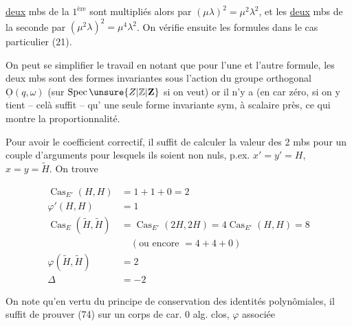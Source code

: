 \uline{deux} mbs de la $1^{\mathrm{ère}}$ sont multipliés alors par $(\mu\lambda)^2=\mu^2\lambda^2$, et les \uline{deux} mbs de la seconde par $(\mu^2\lambda)^2=\mu^4\lambda^2$. On vérifie ensuite les formules dans le cas particulier (21).

On peut se simplifier le travail en notant que pour l'une et l'autre formule, les deux mbs sont des formes invariantes sous l'action du groupe  orthogonal $\underline{\mathrm O}(q,\omega)$ (sur $\operatorname{Spec}\unsure{Z|\mathbb Z|\mathbf Z}$ si on veut) or il n'y a (en car zéro, si on y tient -- celà suffit -- qu' une seule forme invariante sym, à scalaire près, ce qui montre la proportionnalité.

Pour avoir le coefficient correctif, il suffit de calculer la valeur des 2 mbs pour un couple d'arguments pour lesquels ils soient non nuls, p.ex. $x'=y'=H$, $x=y=\widetilde H$. On trouve

\[
\begin{aligned}
\operatorname{Cas}_{E'}(H,H)&=1+1+0=2\\
\varphi'(H,H)&=1\\
\operatorname{Cas}_E(\widetilde H,\widetilde H)
&=\operatorname{Cas}_{E'}(2H,2H)=4\operatorname{Cas}_{E'}(H,H)=8\\
&\quad(\text{ou encore }=4+4+0)\\
\varphi(\widetilde H,\widetilde H)&=2\\
\Delta&=-2
\end{aligned}
\]

On note qu'en vertu du  principe de conservation des identités polynômiales, il suffit de prouver (74) sur un corps de car. 0 alg. clos,   $\varphi$ associée

